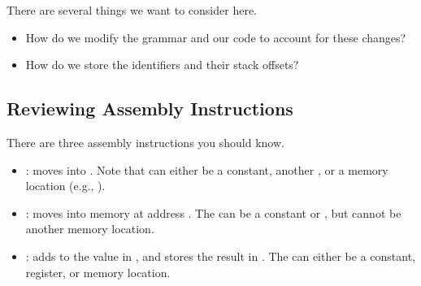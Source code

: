 There are several things we want to consider here.
\begin{itemize}
    \item How do we modify the grammar and our code to account for these changes?
    \item How do we store the identifiers and their stack offsets? 
\end{itemize}

\subsection{Reviewing Assembly Instructions}
There are three assembly instructions you should know.
\begin{itemize}
    \item {}: moves  into . Note that  can either be a constant, another , or a memory location (e.g., \code{[rsp - X]}).
    \item {}: moves  into memory at address . The  can be a constant or , but cannot be another memory location. 
    \item {}: adds  to the value in , and stores the result in . The  can either be a constant, register, or memory location.  
\end{itemize}

